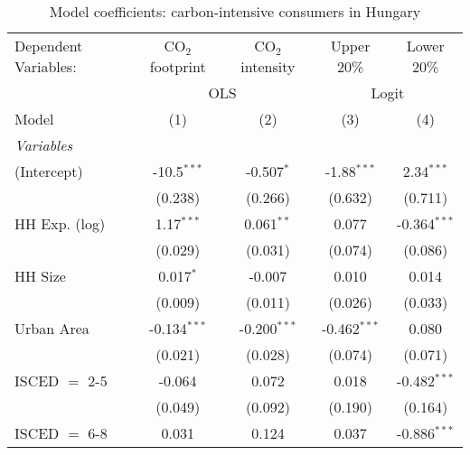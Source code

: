 
\begin{table}[htbp!]
   \centering
   \small
   \begin{adjustbox}{width = 1\textwidth, max height = 0.95\textheight, center}
      \begin{threeparttable}[b]
         \caption{\label{tab:Logit_1_HUN} Model coefficients: carbon-intensive consumers in Hungary}
         \begin{tabular}{lcccc}
            \tabularnewline \midrule \midrule
            Dependent Variables: & CO$_{2}$ footprint & CO$_{2}$ intensity & Upper 20\%     & Lower 20\%\\   
             & \multicolumn{2}{c}{OLS} & \multicolumn{2}{c}{Logit} \\ 
            Model                & (1)                & (2)                & (3)            & (4)\\  
            \midrule
            \emph{Variables}\\
            (Intercept)          & -10.5$^{***}$      & -0.507$^{*}$       & -1.88$^{***}$  & 2.34$^{***}$\\   
                                 & (0.238)            & (0.266)            & (0.632)        & (0.711)\\   
            HH Exp. (log)        & 1.17$^{***}$       & 0.061$^{**}$       & 0.077          & -0.364$^{***}$\\   
                                 & (0.029)            & (0.031)            & (0.074)        & (0.086)\\   
            HH Size              & 0.017$^{*}$        & -0.007             & 0.010          & 0.014\\   
                                 & (0.009)            & (0.011)            & (0.026)        & (0.033)\\   
            Urban Area           & -0.134$^{***}$     & -0.200$^{***}$     & -0.462$^{***}$ & 0.080\\   
                                 & (0.021)            & (0.028)            & (0.074)        & (0.071)\\   
            ISCED $=$ 2-5        & -0.064             & 0.072              & 0.018          & -0.482$^{***}$\\   
                                 & (0.049)            & (0.092)            & (0.190)        & (0.164)\\   
            ISCED $=$ 6-8        & 0.031              & 0.124              & 0.037          & -0.886$^{***}$\\   

\end{tabular}
\end{threeparttable}
\end{adjustbox}
\end{table}
